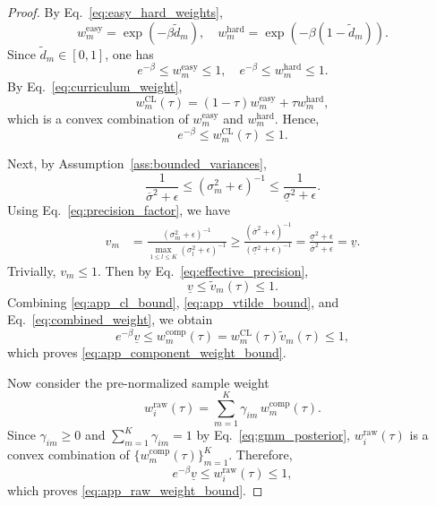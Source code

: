 \documentclass{article}
\theoremstyle{plain}
\theoremstyle{definition}
\theoremstyle{remark}
\begin{document}
\begin{proof}
	By Eq.~\eqref{eq:easy_hard_weights},
	\[
	w_m^{\mathrm{easy}}=\exp(-\beta\tilde d_m),
	\quad
	w_m^{\mathrm{hard}}=\exp(-\beta(1-\tilde d_m)).
	\]
	Since $\tilde d_m\in[0,1]$, one has
	\begin{equation}
		e^{-\beta}\leqslant w_m^{\mathrm{easy}}\leqslant 1,
		\quad
		e^{-\beta}\leqslant w_m^{\mathrm{hard}}\leqslant 1.
		\label{eq:app_easy_hard_bound}
	\end{equation}
	By Eq.~\eqref{eq:curriculum_weight},
	\[
	w_m^{\mathrm{CL}}(\tau)
	=
	(1-\tau)w_m^{\mathrm{easy}}
	+
	\tau w_m^{\mathrm{hard}},
	\]
	which is a convex combination of
	$w_m^{\mathrm{easy}}$ and $w_m^{\mathrm{hard}}$.
	Hence,
	\begin{equation}
		e^{-\beta}\leqslant w_m^{\mathrm{CL}}(\tau)\leqslant 1.
		\label{eq:app_cl_bound}
	\end{equation}
	
	Next, by Assumption~\ref{ass:bounded_variances},
	\begin{equation}
		\frac{1}{\overline{\sigma}^{2}+\epsilon}
		\leqslant
		(\sigma_m^{2}+\epsilon)^{-1}
		\leqslant
		\frac{1}{\underline{\sigma}^{2}+\epsilon}.
		\label{eq:app_inverse_variance_bound}
	\end{equation}
	Using Eq.~\eqref{eq:precision_factor}, we have
	\begin{align}
		v_m
		&=
		\frac{(\sigma_m^{2}+\epsilon)^{-1}}
		{\max_{1\leqslant l\leqslant K}(\sigma_l^{2}+\epsilon)^{-1}}
		\geqslant
		\frac{(\overline{\sigma}^{2}+\epsilon)^{-1}}
		{(\underline{\sigma}^{2}+\epsilon)^{-1}}
		=
		\frac{\underline{\sigma}^{2}+\epsilon}
		{\overline{\sigma}^{2}+\epsilon}
		=
		\underline{v}.
		\label{eq:app_vm_lower}
	\end{align}
	Trivially, $v_m\leqslant 1$. Then by Eq.~\eqref{eq:effective_precision},
	\begin{equation}
		\underline{v}\leqslant \tilde v_m(\tau)\leqslant 1.
		\label{eq:app_vtilde_bound}
	\end{equation}
	Combining \eqref{eq:app_cl_bound},
	\eqref{eq:app_vtilde_bound}, and
	Eq.~\eqref{eq:combined_weight}, we obtain
	\[
	e^{-\beta}\underline{v}
	\leqslant
	w_m^{\mathrm{comp}}(\tau)
	=
	w_m^{\mathrm{CL}}(\tau)\tilde v_m(\tau)
	\leqslant
	1,
	\]
	which proves \eqref{eq:app_component_weight_bound}.
	
	Now consider the pre-normalized sample weight
	\[
	w_i^{\mathrm{raw}}(\tau)
	=
	\sum_{m=1}^{K}\gamma_{im}\,w_m^{\mathrm{comp}}(\tau).
	\]
	Since $\gamma_{im}\geqslant 0$ and
	$\sum_{m=1}^{K}\gamma_{im}=1$ by Eq.~\eqref{eq:gmm_posterior},
	$w_i^{\mathrm{raw}}(\tau)$ is a convex combination of
	$\{w_m^{\mathrm{comp}}(\tau)\}_{m=1}^{K}$.
	Therefore,
	\[
	e^{-\beta}\underline{v}
	\leqslant
	w_i^{\mathrm{raw}}(\tau)
	\leqslant
	1,
	\]
	which proves \eqref{eq:app_raw_weight_bound}.
	

\end{proof}
\end{document}
